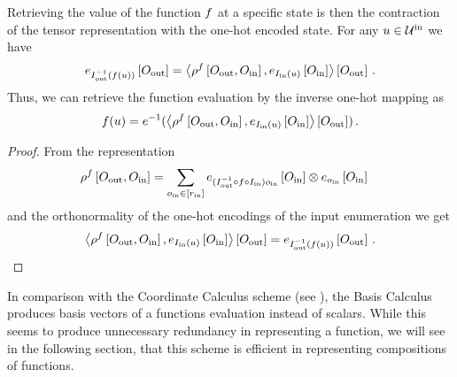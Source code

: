 \begin{theorem}\label{the:basisCalculus}
	Retrieving the value of the function $f$ at a specific state is then the contraction of the tensor representation with the one-hot encoded state.
	For any $u\in\mathcal{U}^{\mathrm{in}}$ we have
	\begin{align*}
		e_{I_{\mathrm{out}}^{-1}(f(u))}\left[O_{\mathrm{out}}\right]
		= \left\langle 
			\rho^{f}\left[O_{\mathrm{out}},O_{\mathrm{in}}\right],
			e_{I_{\mathrm{in}}(u)}\left[O_{\mathrm{in}}\right]
		\right\rangle \left[ O_{\mathrm{out}} \right] \, .
	\end{align*}
	Thus, we can retrieve the function evaluation by the inverse one-hot mapping as
	\begin{align*}
		f(u) = e^{-1}(\left\langle 
			\rho^{f}\left[O_{\mathrm{out}},O_{\mathrm{in}}\right],
			e_{I_{\mathrm{in}}(u)}\left[O_{\mathrm{in}}\right]
		\right\rangle \left[ O_{\mathrm{out}} \right]) \, .
\end{align*}
\end{theorem}
\begin{proof}
	From the representation
	\begin{align*}
		\rho^{f}\left[O_{\mathrm{out}},O_{\mathrm{in}}\right]
		& =  \sum_{o_{\mathrm{in}}\in[r_{\mathrm{in}}]}
			e_{(I_{\mathrm{out}}^{-1} \circ f \circ I_{\mathrm{in}}) o_{\mathrm{in}}
				}\left[O_{\mathrm{in}}\right]
			\otimes
			e_{o_{\mathrm{in}}}\left[O_{\mathrm{in}}\right]
	\end{align*}
	and the orthonormality of the one-hot encodings of the input enumeration we get
	\begin{align*}
		 \left\langle 
			\rho^{f}\left[O_{\mathrm{out}},O_{\mathrm{in}}\right],
			e_{I_{\mathrm{in}}(u)}\left[O_{\mathrm{in}}\right]
		\right\rangle \left[ O_{\mathrm{out}} \right]
		= e_{I_{\mathrm{out}}^{-1}(f(u))}\left[O_{\mathrm{out}}\right] \, .
	\end{align*}
\end{proof}

In comparison with the Coordinate Calculus scheme (see ), the Basis Calculus produces basis vectors of a functions evaluation instead of scalars.
While this seems to produce unnecessary redundancy in representing a function, we will see in the following section, that this scheme is efficient in representing compositions of functions.

